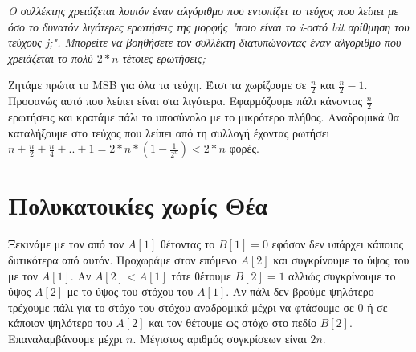 \documentclass[a4paper,10pt]{article} \usepackage{anysize}
\begin{document}
\textit{Ο συλλέκτης χρειάζεται λοιπόν έναν αλγόριθμο που εντοπίζει το τεύχος που
λείπει με όσο το δυνατόν λιγότερες ερωτήσεις της μορφής "ποιο είναι το i-οστό
bit αρίθμηση του τεύχους j;". Μπορείτε να βοηθήσετε τον συλλέκτη διατυπώνοντας
έναν αλγοριθμο που χρειάζεται το πολύ $2*n$ τέτοιες ερωτήσεις;}\vspace{0.4cm}

Ζητάμε πρώτα το MSB για όλα τα τεύχη. Έτσι τα χωρίζουμε σε $\frac{n}{2}$ και
$\frac{n}{2}-1$. Προφανώς αυτό που λείπει είναι στα λιγότερα. Εφαρμόζουμε πάλι
κάνοντας $\frac{n}{2}$ ερωτήσεις και κρατάμε πάλι το υποσύνολο με το μικρότερο
πλήθος. Αναδρομικά θα καταλήξουμε στο τεύχος που λείπει από τη συλλογή έχοντας
ρωτήσει $n+\frac{n}{2}+\frac{n}{4}+..+1=2*n*(1-\frac{1}{2^n}) < 2*n$ φορές.
\section{Πολυκατοικίες χωρίς Θέα}
\vspace{0.4cm}
Ξεκινάμε με τον από τον $A[1]$ θέτοντας το $B[1]=0$ εφόσον δεν υπάρχει κάποιος
δυτικότερα από αυτόν. Προχωράμε στον επόμενο $A[2]$ και συγκρίνουμε το ύψος
του με τον $A[1]$. Αν $A[2]<A[1]$ τότε θέτουμε $B[2]=1$ αλλιώς συγκρίνουμε το
ύψος $A[2]$ με το ύψος του στόχου του $A[1]$. Αν πάλι δεν βρούμε ψηλότερο
τρέχουμε πάλι για το στόχο του στόχου αναδρομικά μέχρι να φτάσουμε σε 0
ή σε κάποιον ψηλότερο του $A[2]$ και τον θέτουμε ως στόχο στο πεδίο $B[2]$.
Επαναλαμβάνουμε μέχρι $n$. Μέγιστος αριθμός συγκρίσεων είναι $2n$.
\end{document}
